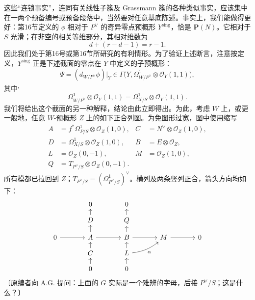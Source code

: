 这些“连锁事实”，连同有关线性子簇及 Grassmann 簇的各种类似事实，应该集中在一两个预备编号或预备段落中，当然要对任意基底陈述。事实上，我们能做得更好：第16节定义的 $\phi$ 相对于 $P^\vee$ 的奇异零点预概形 $Y^{\mathrm{sing}}$，恰是 $\mathbf P(N)$。它相对于 $S$ 光滑；在非空的相关等维部分，其相对维数为
\[
d+(r-d-1)=r-1.
\]
因此我们处于第16号或第16节所研究的有利情形。为了验证上述断言，注意按定义，$Y^{\mathrm{sing}}$ 正是下述截面的零点在 $Y$ 中定义的子预概形：
\[
\Psi=(d_{W/P^\vee}\phi)|_Y
\in\Gamma\bigl(Y,\Omega^1_{W/P^\vee}\otimes\mathcal O_Y(1,1)\bigr),
\]
其中\textsuperscript{,}
\[
\Omega^1_{W/P^\vee}\otimes\mathcal O_Y(1,1)
=\Omega^1_{X/S}\otimes\mathcal O_Y(1,1).
\]
我们将给出这个截面的另一种解释，结论由此立即得出。为此，考虑 $W$ 上，或更一般地，任意 $W$-预概形 $Z$ 上的如下正合列图。为免图形过宽，图中使用缩写
\[
\begin{aligned}
 A&=f^*\Omega^1_{P/S}\otimes\mathcal O_Z(1,0),& C&=N^\vee\otimes\mathcal O_Z(1,0),\\
 D&=\Omega^1_{X/S}\otimes\mathcal O_Z(1,0),& B&=E\otimes\mathcal O_Z,\\
 L&=\mathcal O_Z(0,-1),& M&=\mathcal O_Z(1,0),\\
 Q&=T_{P^\vee/S}\otimes\mathcal O_Z(0,-1).&&
\end{aligned}
\]
所有模都已拉回到 $Z$；$T_{P^\vee/S}=(\Omega^1_{P^\vee/S})^\vee$。横列及两条竖列正合，箭头方向均如下：
\[
\begin{tikzcd}[row sep=small,column sep=large]
 &0&0&\\
 &D\arrow[u]&Q\arrow[u]&\\
 0\arrow[r]&A\arrow[u]\arrow[r]&B\arrow[u]\arrow[r]&M\arrow[r]&0\\
 &C\arrow[u]&L\arrow[u]\arrow[ur,bend right=15,"\alpha"']&\\
 &0\arrow[u]&0\arrow[u]&
\end{tikzcd}
\]
〔原编者向 A.G. 提问：上面的 $G$ 实际是一个难辨的字母，后接 $P^\vee/S$；这是什么？〕

